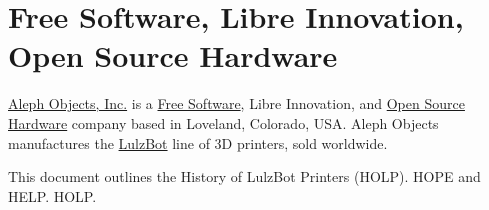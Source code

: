 %
%
%
%
%

\section{Free Software, Libre Innovation, Open Source Hardware}

\href{https://www.alephobjects.com/}{Aleph Objects, Inc.} is a
\href{https://www.fsf.org/}{Free Software},
Libre Innovation, and
\href{http://www.oshwa.org/}{Open Source Hardware}
company based in Loveland, Colorado, USA. Aleph Objects
manufactures the
\href{https://www.lulzbot.com/}{LulzBot} line of 3D printers, sold worldwide.

This document outlines the History of LulzBot Printers (HOLP).
HOPE and HELP. HOLP.

